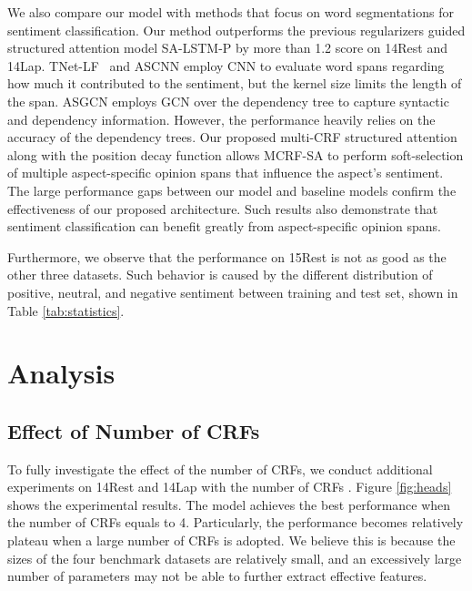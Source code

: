 \documentclass[11pt,a4paper]{article}
\begin{document}
We also compare our model with methods that focus on word segmentations for sentiment classification. 
Our method outperforms the previous regularizers guided structured attention model SA-LSTM-P \cite{bailin-lu:2018:AAAI2018} by more than 1.2  score on 14Rest and 14Lap. 
TNet-LF~\cite{lixin2018P18-1087} and ASCNN \cite{zhang-etal-2019-aspect} employ CNN to evaluate word spans regarding how much it contributed to the sentiment, but the kernel size limits the length of the span.
ASGCN \cite{zhang-etal-2019-aspect} employs GCN over the dependency tree to capture syntactic and dependency information. However, the performance heavily relies on the accuracy of the dependency trees.
Our proposed multi-CRF structured attention along with the position decay function allows MCRF-SA to perform soft-selection of multiple aspect-specific opinion spans that influence the aspect's sentiment. The large performance gaps between our model and baseline models confirm the effectiveness of our proposed architecture. Such results also demonstrate that sentiment classification can benefit greatly from aspect-specific opinion spans.

Furthermore, we observe that the performance on 15Rest is not as good as the other three datasets. Such behavior is caused by the different distribution of positive, neutral, and negative sentiment between training and test set, shown in Table \ref{tab:statistics}.


\section{Analysis}
\subsection{Effect of Number of CRFs}
To fully investigate the effect of the number of CRFs, we conduct additional experiments on 14Rest and 14Lap with the number of CRFs . Figure \ref{fig:heads} shows the experimental results.
The model achieves the best performance when the number of CRFs equals to 4. Particularly, the performance becomes relatively plateau when a large number of CRFs is adopted. We believe this is because the sizes of the four benchmark datasets are relatively small, and an excessively large number of parameters may not be able to further extract effective features. 
\end{document}
